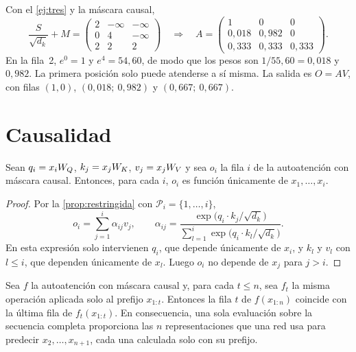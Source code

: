 \begin{ejemplo}\label{ej:mascara}
Con el \cref{ej:tres} y la máscara causal,
\[
\frac{S}{\sqrt{d_k}}+M=\begin{pmatrix}2&-\infty&-\infty\\0&4&-\infty\\2&2&2\end{pmatrix}
\quad\Longrightarrow\quad
A=\begin{pmatrix}1&0&0\\0{,}018&0{,}982&0\\0{,}333&0{,}333&0{,}333\end{pmatrix}.
\]
En la fila~2, $e^{0}=1$ y $e^{4}=54{,}60$, de modo que los pesos son $1/55{,}60=0{,}018$ y $0{,}982$. La primera posición solo puede atenderse a sí misma. La salida es $O=AV$, con filas $(1,0)$, $(0{,}018;\allowbreak\ 0{,}982)$ y $(0{,}667;\allowbreak\ 0{,}667)$.
\end{ejemplo}

\section{Causalidad}

\begin{teorema}\label{teo:causal}
Sean $q_i=x_iW_{Q}$, $k_j=x_jW_{K}$, $v_j=x_jW_{V}$ y sea $o_i$ la fila $i$ de la autoatención con máscara causal. Entonces, para cada $i$, $o_i$ es función únicamente de $x_1,\dots,x_i$.
\end{teorema}

\begin{proof}
Por la \cref{prop:restringida} con $\mathcal{P}_i=\{1,\dots,i\}$,
\[
o_i=\sum_{j=1}^{i}\alpha_{ij}v_j,\qquad
\alpha_{ij}=\frac{\exp\bigl(q_i\cdot k_j/\sqrt{d_k}\bigr)}{\sum_{l=1}^{i}\exp\bigl(q_i\cdot k_l/\sqrt{d_k}\bigr)} .
\]
En esta expresión solo intervienen $q_i$, que depende únicamente de $x_i$, y $k_l$ y $v_l$ con $l\le i$, que dependen únicamente de $x_l$. Luego $o_i$ no depende de $x_j$ para $j>i$.
\end{proof}

\begin{corolario}\label{cor:paralelo}
Sea $f$ la autoatención con máscara causal y, para cada $t\le n$, sea $f_t$ la misma operación aplicada solo al prefijo $x_{1:t}$. Entonces la fila $t$ de $f(x_{1:n})$ coincide con la última fila de $f_t(x_{1:t})$. En consecuencia, una sola evaluación sobre la secuencia completa proporciona las $n$ representaciones que una red usa para predecir $x_2,\dots,x_{n+1}$, cada una calculada solo con su prefijo.
\end{corolario}

